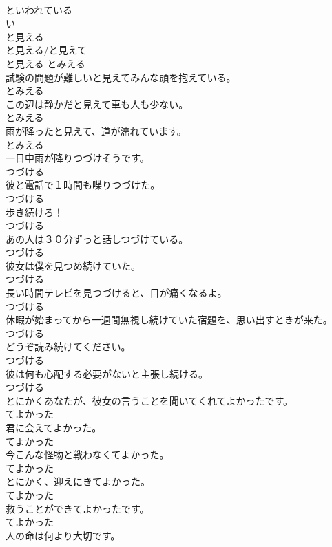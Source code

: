 \documentclass[8pt]{extreport}
\begin{document}
\begin{CJK}{UTF8}{min}
\\	といわれている
\\	い
\\	と見える	
\\	と見える/と見えて	
\\	と見える	とみえる
\\	試験の問題が難しいと見えてみんな頭を抱えている。	
\\	とみえる
\\	この辺は静かだと見えて車も人も少ない。	
\\	とみえる
\\	雨が降ったと見えて、道が濡れています。	
\\	とみえる
\\	一日中雨が降りつづけそうです。	
\\	つづける
\\	彼と電話で１時間も喋りつづけた。	
\\	つづける
\\	歩き続けろ！	
\\	つづける
\\	あの人は３０分ずっと話しつづけている。	
\\	つづける
\\	彼女は僕を見つめ続けていた。	
\\	つづける
\\	長い時間テレビを見つづけると、目が痛くなるよ。	
\\	つづける
\\	休暇が始まってから一週間無視し続けていた宿題を、思い出すときが来た。	
\\	つづける
\\	どうぞ読み続けてください。	
\\	つづける
\\	彼は何も心配する必要がないと主張し続ける。	
\\	つづける
\\	とにかくあなたが、彼女の言うことを聞いてくれてよかったです。	
\\	てよかった
\\	君に会えてよかった。	
\\	てよかった
\\	今こんな怪物と戦わなくてよかった。	
\\	てよかった
\\	とにかく、迎えにきてよかった。	
\\	てよかった
\\	救うことができてよかったです。	
\\	てよかった
\\	人の命は何より大切です。	

\end{CJK}
\end{document}
